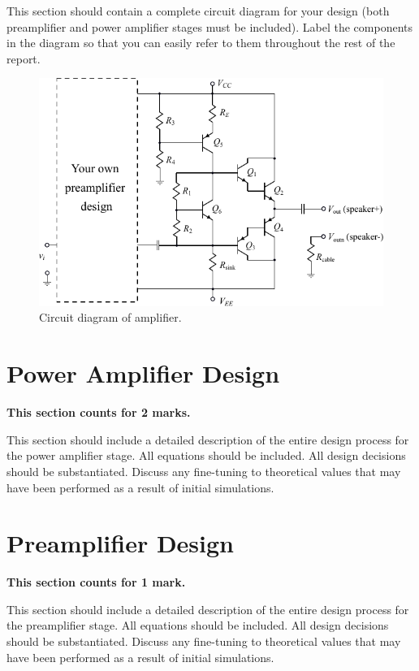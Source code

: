 \documentclass{article}
\begin{document}
This section should contain a complete circuit diagram for your design (both preamplifier and power amplifier stages must be included). Label the components in the diagram so that you can easily refer to them throughout the rest of the report.

\begin{figure}[h!]
  \centering
  \includegraphics[width=0.6\linewidth]{images/circdiagram.pdf}
  \caption{Circuit diagram of amplifier.}
  \label{fig:circschem}
\end{figure}


\section{Power Amplifier Design}
\textbf{This section counts for 2 marks.}

This section should include a detailed description of the entire design process for the power amplifier stage. All equations should be included. All design decisions should be substantiated. Discuss any fine-tuning to theoretical values that may have been performed as a result of initial simulations.

\section{Preamplifier Design}
\textbf{This section counts for 1 mark.}

This section should include a detailed description of the entire design process for the preamplifier stage. All equations should be included. All design decisions should be substantiated. Discuss any fine-tuning to theoretical values that may have been performed as a result of initial simulations.
\end{document}
